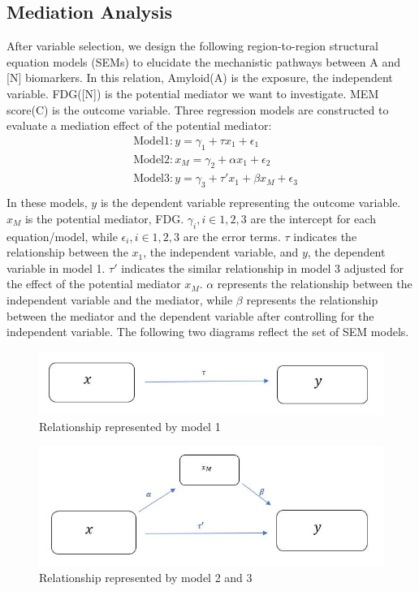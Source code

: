 \documentclass{article}
\begin{document}
\subsection{Mediation Analysis
}
After variable selection, we design the following region-to-region structural equation models (SEMs) to elucidate the mechanistic pathways between A and [N] biomarkers. In this relation, Amyloid(A) is the exposure, the independent variable. FDG([N]) is the potential mediator we want to investigate. MEM score(C) is the outcome variable. 
Three regression models are constructed to evaluate a mediation effect of the potential mediator:
\begin{equation}
    \begin{aligned}
        &\mathrm{Model}1: y=\gamma_1+\tau x_1+\epsilon_1 \\
        &\mathrm{Model}2: x_M=\gamma_2+\alpha x_1+\epsilon_2 \\
        &\mathrm{Model}3: y=\gamma_3+\tau' x_1+\beta x_M+\epsilon_3\\ 
    \end{aligned}
\end{equation}
In these models, $y$ is the dependent variable representing the outcome variable. $x_M$ is the potential mediator, FDG. $\gamma_i,i\in{1,2,3}$ are the intercept for each equation/model, while $\epsilon_i,i\in{1,2,3}$ are the error terms. $\tau$ indicates the relationship between the $x_1$, the independent variable, and $y$, the dependent variable in model 1. $\tau'$ indicates the similar relationship in model 3 adjusted for the effect of the potential mediator $x_M$. $\alpha$ represents the relationship between the independent variable and the mediator, while $\beta$ represents the relationship between the mediator and the dependent variable after controlling for the independent variable. The following two diagrams reflect the set of SEM models.
\begin{figure}[h]
         \centering
         \includegraphics[scale=0.6]{diagram1.jpg}
         \caption{Relationship represented by model 1}
\end{figure}
\begin{figure}[h]
         \centering
         \includegraphics[scale=0.6]{diagram2.jpg}
         \caption{Relationship represented by model 2 and 3}
\end{figure}
\end{document}
